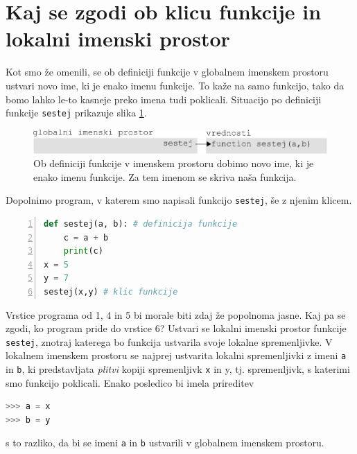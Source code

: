 \section{Kaj se zgodi ob klicu funkcije in lokalni imenski prostor}
Kot smo že omenili, se ob definiciji funkcije v globalnem imenskem prostoru ustvari novo ime, ki je enako imenu funkcije. To kaže na samo funkcijo, tako da bomo lahko le-to kasneje preko imena tudi poklicali. Situacijo po definiciji funkcije \texttt{sestej} prikazuje slika \ref{img:imenski_prostor_2}. \begin{figure}
    \includegraphics[width=\linewidth]{img/imenski_prostor_2.pdf}
    \caption{Ob definiciji funkcije v imenskem prostoru dobimo novo ime, ki je enako imenu funkcije. Za tem imenom se skriva naša funkcija.}
    \label{img:imenski_prostor_2}
\end{figure}

Dopolnimo program, v katerem smo napisali funkcijo \texttt{sestej}, še z njenim klicem.
\begin{lstlisting}[language=Python,numbers=left]
def sestej(a, b): # definicija funkcije
    c = a + b
    print(c)
x = 5
y = 7
sestej(x,y) # klic funkcije
\end{lstlisting}
Vrstice programa od 1, 4 in 5 bi morale biti zdaj že popolnoma jasne. Kaj pa se zgodi, ko program pride do vrstice 6? Ustvari se lokalni imenski prostor funkcije \texttt{sestej}, znotraj katerega bo funkcija ustvarila svoje lokalne spremenljivke. V lokalnem imenskem prostoru se najprej ustvarita lokalni spremenljivki z imeni \texttt{a} in \texttt{b}, ki predstavljata \emph{plitvi} kopiji spremenljivk \texttt{x} in {y}, tj. spremenljivk, s katerimi smo funkcijo poklicali. Enako posledico bi imela prireditev
\begin{lstlisting}[language=Python]
>>> a = x
>>> b = y
\end{lstlisting}
s to razliko, da bi se imeni \texttt{a} in \texttt{b} ustvarili v globalnem imenskem prostoru.

